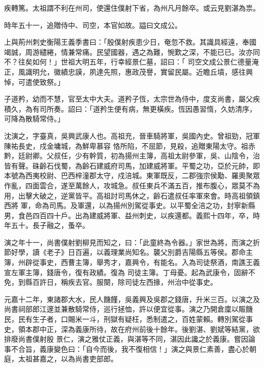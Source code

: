 \begin{pinyinscope}
 疾轉篤。太祖謂不利在州司，使還住僕射下省，為州凡月餘卒。或云見劉湛為祟。



 時年五十一，追贈侍中、司空，本官如故。謚曰文成公。



 上與荊州刺史衡陽王義季書曰：「殷僕射疾患少日，奄忽不救。其識具經遠，奉國竭誠，周游繾綣，情兼常痛。民望國器，遇之為難，惋歎之深，不能已已。汝亦同不？往矣如何！」世祖大明五年，行幸經景仁墓，詔曰：「
 司空文成公景仁德量淹正，風識明允，徽績忠謨，夙達先照，惠政茂譽，實留民屬。近瞻丘墳，感往興悼，可遣使致祭。」



 子道矜，幼而不慧，官至太中大夫。道矜子恆，太宗世為侍中，度支尚書，屬父疾積久，為有司所奏。詔曰：「道矜生便有病，無更橫疾。恆因愚習惰，久妨清序，可降為散騎常侍。」



 沈演之，字臺真，吳興武康人也。高祖充，晉車騎將軍，吳國內史。曾祖勁，冠軍陳祐長史，戍金墉城，為鮮卑慕容
 恪所陷，不屈節，見殺，追贈東陽太守。祖赤黔，廷尉卿。父叔任，少有幹質，初為揚州主簿，高祖太尉參軍，吳、山陰令，治皆有聲。硃齡石伐蜀，為齡石建威府司馬，加建威將軍。平蜀之功，亞於元帥，即本號為西夷校尉、巴西梓潼郡太守，戍涪城。東軍既反，二郡強宗侯勱、羅奧聚眾作亂，四面雲合，遂至萬餘人，攻城急。叔任東兵不滿五百，推布腹心，眾莫不為用，出擊大破之，逆黨皆平。高祖討司馬休之，齡石遣叔任率軍來會。時高祖領鎮西將
 軍，命為司馬。及軍還，以為揚州別駕從事史。以平蜀全涪之功，封寧新縣男，食邑四百四十戶。出為建威將軍、益州刺史，以疾還都。義熙十四年，卒，時年五十。長子融之，蚤卒。



 演之年十一，尚書僕射劉柳見而知之，曰：「此童終為令器。」家世為將，而演之折節好學，讀《老子》日百遍，以義理業尚知名。襲父別爵吉陽縣五等侯。郡命主簿，州辟從事史，西曹主簿，舉秀才，嘉興令，有能名。入為司徒祭酒，南譙王義宣左軍主簿，錢唐令，復有政績。復為
 司徒主簿。丁母憂。起為武康令，固辭不免，到縣百許日，稱疾去官。服闋，除司徒左西掾，州治中從事史。



 元嘉十二年，東諸郡大水，民人饑饉，吳義興及吳郡之錢唐，升米三百。以演之及尚書祠部郎江邃並兼散騎常侍，巡行拯恤，許以便宜從事。演之乃開倉廩以賑饑民，民有生子者，口賜米一斗，刑獄有疑枉，悉制遣之，百姓蒙賴。轉別駕從事史，領本郡中正，深為義康所待，故在府州前後十餘年。後劉湛、劉斌等結黨，欲排廢尚書僕射殷
 景仁，演之雅仗正義，與湛等不同，湛因此讒之於義康。嘗因論事不合旨，義康變色曰：「自今而後，我不復相信！」演之與景仁素善，盡心於朝庭，太祖甚嘉之，以為尚書吏部郎。




\end{pinyinscope}
